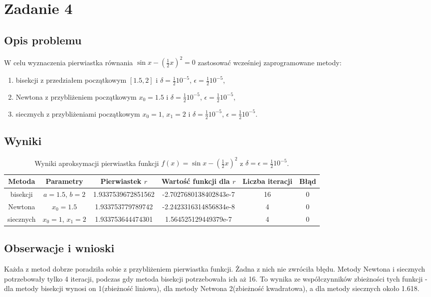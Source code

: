\documentclass{article}
\begin{document}
\section{Zadanie 4}
\subsection{Opis problemu}
W celu wyznaczenia pierwiastka równania \( \sin x - \left( \frac{1}{2} x \right)^2 = 0 \) zastosować wcześniej zaprogramowane metody:
\begin{enumerate}
  \item bisekcji z przedziałem początkowym \([1.5, 2]\) i \( \delta = \frac{1}{2} 10^{-5} \), \( \epsilon = \frac{1}{2} 10^{-5} \),
  \item Newtona z przybliżeniem początkowym \( x_0 = 1.5 \) i \( \delta = \frac{1}{2} 10^{-5} \), \( \epsilon = \frac{1}{2} 10^{-5} \),
  \item siecznych z przybliżeniami początkowym \( x_0 = 1 \), \( x_1 = 2 \) i \( \delta = \frac{1}{2} 10^{-5} \), \( \epsilon = \frac{1}{2} 10^{-5} \).
\end{enumerate}

\subsection{Wyniki}
\begin{table}[H]
\begin{adjustbox}{center}
\begin{tabular}{|c|c|c|c|c|c|}
    \hline
    Metoda & Parametry & Pierwiastek $r$ & Wartość funkcji dla $r$ & Liczba iteracji & Błąd\\
    \hline
    bisekcji & $a = 1.5$, $b = 2$ & 1.9337539672851562 & -2.7027680138402843e-7 & 16 & 0\\
    \hline
    Newtona & $x_0 = 1.5$ & 1.933753779789742 & -2.2423316314856834e-8 & 4 & 0\\
    \hline
    siecznych & $x_0 = 1$, $x_1 = 2$ & 1.933753644474301 & 1.564525129449379e-7 & 4 & 0\\
    \hline
\end{tabular}
\end{adjustbox}
\caption{Wyniki aproksymacji pierwiastka funkcji $f(x) = \sin x - \left( \frac{1}{2} x \right)^2$ z $\delta = \epsilon = \frac{1}{2} 10^{-5}$.}
\end{table}

\subsection{Obserwacje i wnioski}
Każda z metod dobrze poradziła sobie z przybliżeniem pierwiastka funkcji. Żadna z nich nie zwróciła błędu. 
Metody Newtona i siecznych potrzebowały tylko 4 iteracji, podczas gdy metoda bisekcji potrzebowała ich aż 16.
To wynika ze współczynników zbieżności tych funkcji - dla metody bisekcji wynosi on 1(zbieżność liniowa),
dla metody Netwona 2(zbieżność kwadratowa), a dla metody siecznych około 1.618.
\end{document}
